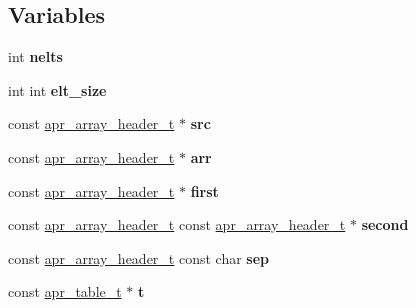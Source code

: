 \subsection*{Variables}
\begin{DoxyCompactItemize}
\item 
\mbox{\label{group__apr__tables_ga3f892b271cc0564b2d8e9536a96abd7c}} 
int {\bfseries nelts}
\item 
\mbox{\label{group__apr__tables_ga922b4b4bccf7114fd241df5bd432ad58}} 
int int {\bfseries elt\+\_\+size}
\item 
\mbox{\label{group__apr__tables_gab6e7405500bdd51690dc9ef83744684f}} 
const \mbox{\hyperlink{structapr__array__header__t}{apr\+\_\+array\+\_\+header\+\_\+t}} $\ast$ {\bfseries src}
\item 
\mbox{\label{group__apr__tables_ga1e3f66bfb173c9a913ef3bb37842e273}} 
const \mbox{\hyperlink{structapr__array__header__t}{apr\+\_\+array\+\_\+header\+\_\+t}} $\ast$ {\bfseries arr}
\item 
\mbox{\label{group__apr__tables_ga950d7fed8d587d0a9318ffd24f95096f}} 
const \mbox{\hyperlink{structapr__array__header__t}{apr\+\_\+array\+\_\+header\+\_\+t}} $\ast$ {\bfseries first}
\item 
\mbox{\label{group__apr__tables_gade8df35e4d83c24788cf409262f7fc51}} 
const \mbox{\hyperlink{structapr__array__header__t}{apr\+\_\+array\+\_\+header\+\_\+t}} const \mbox{\hyperlink{structapr__array__header__t}{apr\+\_\+array\+\_\+header\+\_\+t}} $\ast$ {\bfseries second}
\item 
\mbox{\label{group__apr__tables_ga37d96adf842aef6b03690e17874c9ed8}} 
const \mbox{\hyperlink{structapr__array__header__t}{apr\+\_\+array\+\_\+header\+\_\+t}} const char {\bfseries sep}
\item 
\mbox{\label{group__apr__tables_gad0d127e044cb4fd448cde5c19d10179e}} 
const \mbox{\hyperlink{group__apr__tables_gad7ea82d6608a4a633fc3775694ab71e4}{apr\+\_\+table\+\_\+t}} $\ast$ {\bfseries t}
\item 

\end{DoxyCompactItemize}
